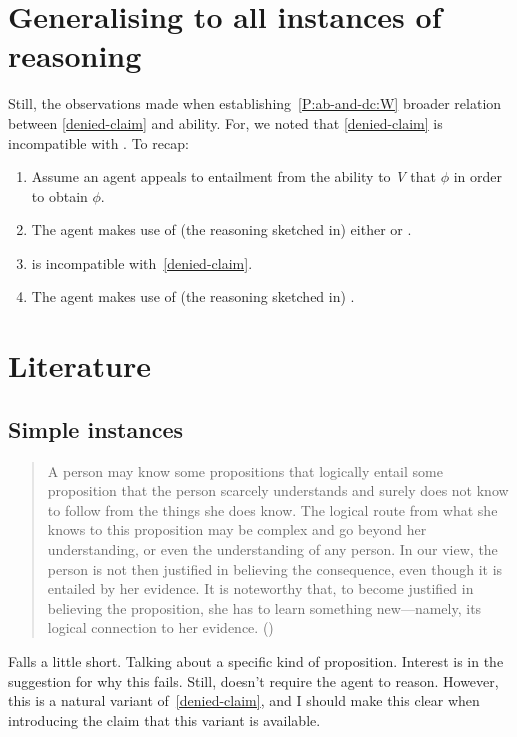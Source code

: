 \section{Generalising \ESU{} to all instances of reasoning}
\label{sec:generalising-ura-all}

\begin{note}
  Still, the observations made when establishing~\ref{P:ab-and-dc:W} broader relation between \ref{denied-claim} and ability.
  For, we noted that \ref{denied-claim} is incompatible with \WR{}.
  To recap:
  \begin{enumerate}[label=(B\arabic*), ref=(B\arabic*)]
  \item Assume an agent appeals to entailment from the ability to \emph{V} that \(\phi\) in order to obtain \(\phi\).
  \item The agent makes use of (the reasoning sketched in) either \AR{} or \WR{}.
  \item \WR{} is incompatible with~\ref{denied-claim}.
  \item The agent makes use of (the reasoning sketched in) \AR{}.
  \end{enumerate}
\end{note}



\section{Literature}
\label{sec:literature}

\subsection{Simple instances}
\label{sec:simple-instances}

\begin{quote}
  A person may know some propositions that logically entail some proposition that the person scarcely understands and surely does not know to follow from the things she does know.
  The logical route from what she knows to this proposition may be complex and go beyond her understanding, or even the understanding of any person.
  In our view, the person is not then justiﬁed in believing the consequence, even though it is entailed by her evidence.
  It is noteworthy that, to become justiﬁed in believing the proposition, she has to learn something new---namely, its logical connection to her evidence.\nolinebreak
  \mbox{}\hfill\mbox{(\citeyear[94]{Conee:wk})}
\end{quote}
Falls a little short.
Talking about a specific kind of proposition.
Interest is in the suggestion for why this fails.
Still, doesn't require the agent to reason.
However, this is a natural variant of~\ref{denied-claim}, {\color{red} and I should make this clear when introducing the claim that this variant is available}.


